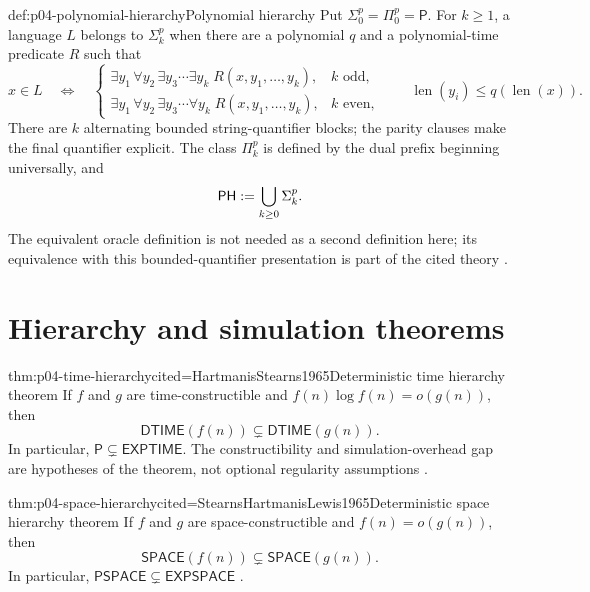 \begin{hbdefinition}{def:p04-polynomial-hierarchy}{Polynomial hierarchy}
Put \(\Sigma^p_0=\Pi^p_0=\mathsf P\).  For \(k\geq1\), a language \(L\)
belongs to \(\Sigma^p_k\) when there are a polynomial \(q\) and a
polynomial-time predicate \(R\) such that
\[
 x\in L\quad\Leftrightarrow\quad
 \begin{cases}
  \exists y_1\,\forall y_2\,\exists y_3\cdots\exists y_k\;
    R(x,y_1,\ldots,y_k),&k\text{ odd},\\
  \exists y_1\,\forall y_2\,\exists y_3\cdots\forall y_k\;
    R(x,y_1,\ldots,y_k),&k\text{ even},
 \end{cases}
 \qquad \operatorname{len}(y_i)\leq q(\operatorname{len}(x)).
\]
There are \(k\) alternating bounded string-quantifier blocks; the parity
clauses make the final quantifier explicit.  The class
\(\Pi^p_k\) is defined by the dual prefix beginning universally, and
\[
 \mathsf{PH}\mathrel{:=}\bigcup_{k\geq0}\Sigma^p_k.
\]
The equivalent oracle definition is not needed as a second definition here;
its equivalence with this bounded-quantifier presentation is part of the
cited theory \cite{Stockmeyer1976,AroraBarak2009}.
\end{hbdefinition}

\section{Hierarchy and simulation theorems}
\label{sec:p04-complexity-hierarchies}

\begin{hbtheorem}{thm:p04-time-hierarchy}{cited=HartmanisStearns1965}{Deterministic time hierarchy theorem}
If \(f\) and \(g\) are time-constructible and
\(f(n)\log f(n)=o(g(n))\), then
\[
 \mathsf{DTIME}(f(n))\subsetneq\mathsf{DTIME}(g(n)).
\]
In particular, \(\mathsf P\subsetneq\mathsf{EXPTIME}\).  The
constructibility and simulation-overhead gap are hypotheses of the theorem,
not optional regularity assumptions \cite[thm.~3.1]{AroraBarak2009}.
\end{hbtheorem}

\begin{hbtheorem}{thm:p04-space-hierarchy}{cited=StearnsHartmanisLewis1965}{Deterministic space hierarchy theorem}
If \(f\) and \(g\) are space-constructible and \(f(n)=o(g(n))\), then
\[
 \mathsf{SPACE}(f(n))\subsetneq\mathsf{SPACE}(g(n)).
\]
In particular,
\(\mathsf{PSPACE}\subsetneq\mathsf{EXPSPACE}\)
\cite[thm.~3.2]{AroraBarak2009}.
\end{hbtheorem}

